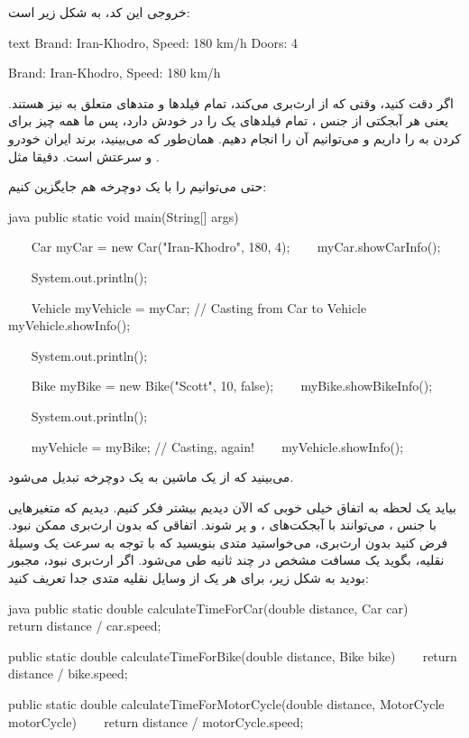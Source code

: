 خروجی این کد، به شکل زیر است:

\begin{codebox}{text}
Brand: Iran-Khodro, Speed: 180 km/h  
Doors: 4  

Brand: Iran-Khodro, Speed: 180 km/h
\end{codebox}

اگر دقت کنید، وقتی که  از  ارث‌بری
می‌کند، تمام فیلدها و متدهای  متعلق به
 نیز هستند. یعنی هر آبجکتی از جنس  ،
تمام فیلدهای یک  را در خودش دارد، پس ما همه چیز
برای  کردن  به  را داریم
و می‌توانیم آن را انجام دهیم. همان‌طور که می‌بینید، برند
 ایران خودرو و سرعتش  است.
دقیقا مثل  .

حتی می‌توانیم  را با یک دوچرخه هم جایگزین کنیم:

\begin{codebox}{java}
public static void main(String[] args) {  
    Car myCar = new Car("Iran-Khodro", 180, 4);  
    myCar.showCarInfo();  
  
    System.out.println();  
  
    Vehicle myVehicle = myCar; // Casting from Car to Vehicle
    myVehicle.showInfo();  
  
    System.out.println();  
  
    Bike myBike = new Bike("Scott", 10, false);  
    myBike.showBikeInfo();  
  
    System.out.println();  
  
    myVehicle = myBike; // Casting, again!
    myVehicle.showInfo();  
}
\end{codebox}

می‌بینید که  از یک ماشین به یک دوچرخه تبدیل می‌شود.

بیاید یک لحظه به اتفاق خیلی خوبی که الآن دیدیم بیشتر فکر کنیم. دیدیم که
متغیرهایی با جنس  ، می‌توانند با آبجکت‌های
 ،  و  پر
شوند. اتفاقی که بدون ارث‌بری ممکن نبود. فرض کنید بدون ارث‌بری، می‌خواستید
متدی بنویسید که با توجه به سرعت یک وسیلهٔ نقلیه، بگوید یک مسافت مشخص در
چند ثانیه طی می‌شود. اگر ارث‌بری نبود، مجبور بودید به شکل زیر، برای هر یک
از وسایل نقلیه‌ متدی جدا تعریف کنید:

\begin{codebox}{java}
public static double calculateTimeForCar(double distance, Car car) {
    return distance / car.speed;  
}

public static double calculateTimeForBike(double distance, Bike bike) {
    return distance / bike.speed;  
}

public static double calculateTimeForMotorCycle(double distance, MotorCycle motorCycle) {
    return distance / motorCycle.speed;  
}
\end{codebox}

